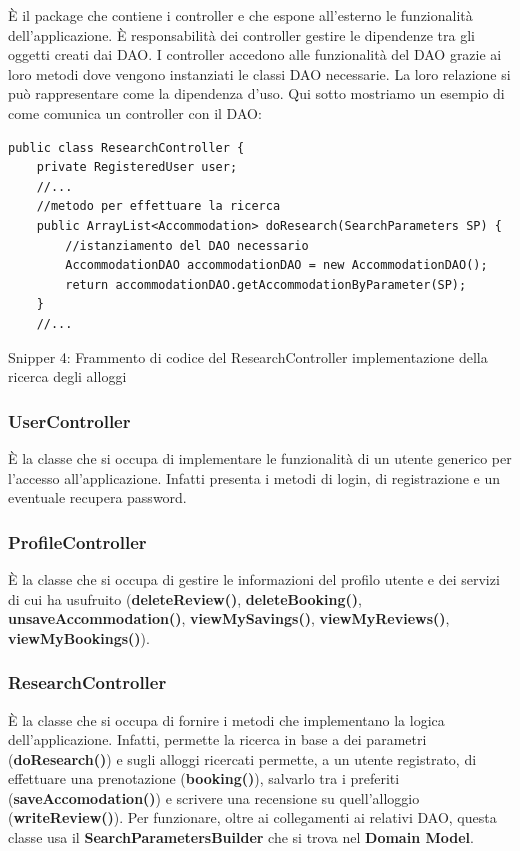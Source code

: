 \documentclass[10pt]{article}
\begin{document}
\`E il package che contiene i controller e che espone all'esterno le funzionalit\`a dell'applicazione. \`E responsabilit\`a dei controller gestire le dipendenze tra gli oggetti creati dai DAO. I controller accedono alle funzionalit\`a del DAO grazie ai loro metodi dove vengono instanziati le classi DAO necessarie. La loro relazione si pu\`o rappresentare come la dipendenza d'uso.
Qui sotto mostriamo un esempio di come comunica un controller con il DAO:
\clearpage
\begin{lstlisting}
public class ResearchController {
    private RegisteredUser user;
    //...
    //metodo per effettuare la ricerca
    public ArrayList<Accommodation> doResearch(SearchParameters SP) {
        //istanziamento del DAO necessario
        AccommodationDAO accommodationDAO = new AccommodationDAO();  
        return accommodationDAO.getAccommodationByParameter(SP);
    }
    //...
\end{lstlisting}
\par\medskip
\begin{center}
Snipper 4: Frammento di codice del ResearchController implementazione della ricerca degli alloggi
\par\medskip
\end{center}
\subsubsection{UserController}

\`E la classe che si occupa di implementare le funzionalit\`a di un utente generico per l'accesso all'applicazione. Infatti presenta i metodi di login, di registrazione e un eventuale recupera password.

\subsubsection{ProfileController}

\`E la classe che si occupa di gestire le informazioni del profilo utente e dei servizi di cui ha usufruito (\textbf{deleteReview()}, \textbf{deleteBooking()}, \textbf{unsaveAccommodation()}, \textbf{viewMySavings()}, \textbf{viewMyReviews()}, \textbf{viewMyBookings()}).

\subsubsection{ResearchController}

\`E la classe che si occupa di fornire i metodi che implementano la logica dell'applicazione. Infatti, permette la ricerca in base a dei parametri (\textbf{doResearch()}) e sugli alloggi ricercati permette, a un utente registrato, di effettuare una prenotazione (\textbf{booking()}), salvarlo tra i preferiti (\textbf{saveAccomodation()}) e scrivere una recensione su quell'alloggio (\textbf{writeReview()}). Per funzionare, oltre ai collegamenti ai relativi DAO, questa classe usa il \textbf{SearchParametersBuilder} che si trova nel \textbf{Domain Model}.
\end{document}
